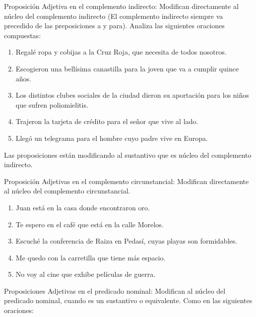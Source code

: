 \begin{lista}
\item Proposición Adjetiva en el complemento indirecto: Modifican
directamente al núcleo del complemento indirecto (El complemento indirecto
siempre va precedido de las preposiciones a y para). Analiza las siguientes
oraciones compuestas: 

\begin{ejems}{}
\begin{enumerate}
\item Regalé ropa y cobijas a la Cruz Roja, \textsf{que necesita de todos
nosotros}. 
\item Escogieron una bellísima canastilla para la joven \textsf{que va a
cumplir quince años}. 
\item Los distintos clubes sociales de la ciudad dieron su aportación para
los niños \textsf{que sufren poliomielitis}. 
\item Trajeron la tarjeta de crédito para el señor \textsf{que vive al lado}. 
\item Llegó un telegrama para el hombre \textsf{cuyo padre vive en Europa}.
\end{enumerate}
\end{ejems}

Las proposiciones están modificando al sustantivo que es núcleo del
complemento indirecto.

\item Proposición Adjetivas en el complemento circunstancial: Modifican
directamente al núcleo del complemento circunstancial. 

\begin{ejems}{}
\begin{enumerate}
\item Juan está en la casa \textsf{donde encontraron oro}. 
\item Te espero en el café \textsf{que está en la calle Morelos}. 
\item Escuché la conferencia de Raiza en Pedasí, \textsf{cuyas playas son
formidables}. 
\item Me quedo con la carretilla \textsf{que tiene más espacio}. 
\item No voy al cine \textsf{que exhibe películas de guerra}.
\end{enumerate}
\end{ejems}

\item Proposiciones Adjetivas en el predicado nominal: Modifican
al núcleo del predicado nominal, cuando es un sustantivo o equivalente.
Como en las siguientes oraciones:


\end{lista}
